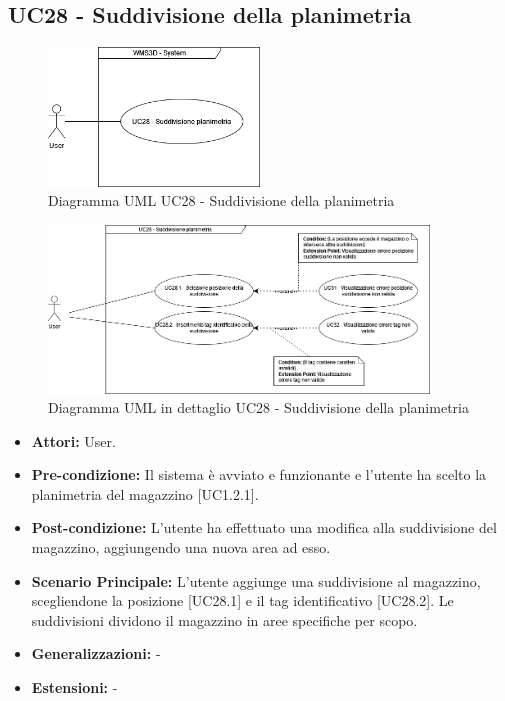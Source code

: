 \subsection{UC28 - Suddivisione della planimetria}
\begin{figure}[H]
  \centering
  \includegraphics[width=0.5\textwidth]{UC_diagrams_28-32/UC28_sys.drawio.png}
  \caption{Diagramma UML UC28 - Suddivisione della planimetria}
\end{figure}
\begin{figure}[H]
  \centering
  \includegraphics[width=0.9\textwidth]{UC_diagrams_28-32/UC28.drawio.png}
  \caption{Diagramma UML in dettaglio UC28 - Suddivisione della planimetria}
\end{figure}
\begin{itemize}
    \item \textbf{Attori:} User.
    \item \textbf{Pre-condizione:} Il sistema è avviato e funzionante e l’utente ha scelto la planimetria del magazzino [UC1.2.1].
    \item \textbf{Post-condizione:} L'utente ha effettuato una modifica alla suddivisione del magazzino, aggiungendo una nuova area ad esso.
    \item \textbf{Scenario Principale:} L'utente aggiunge una suddivisione al magazzino, scegliendone la posizione [UC28.1] e il tag identificativo [UC28.2]. Le suddivisioni dividono il magazzino in aree specifiche per scopo.
    \item \textbf{Generalizzazioni:} -
    \item \textbf{Estensioni:} -
\end{itemize}


